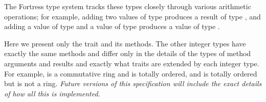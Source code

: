The Fortress type system tracks these types closely through various arithmetic
operations; for example, adding two values of type  produces a result of type ,
and adding a value of type  and a value of type  produces a value
of type .

Here we present only the trait  and its methods.
The other integer types have exactly the same methods and differ
only in the details of the types of method arguments and results
and exactly what traits are extended by each integer type.
For example,  is a commutative ring and is totally ordered,
and  is totally ordered but is not a ring.
\emph{Future versions of this specification will include
the exact details of how all this is implemented.}

